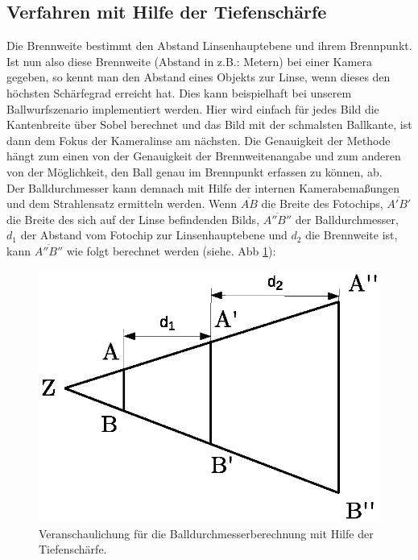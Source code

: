 \documentclass{ezb}
\begin{document}
\subsection{Verfahren mit Hilfe der Tiefenschärfe}
Die Brennweite bestimmt den Abstand Linsenhauptebene und ihrem Brennpunkt. Ist nun also diese Brennweite (Abstand in z.B.: Metern) bei einer Kamera gegeben, so kennt man den Abstand eines Objekts zur Linse, wenn dieses den höchsten Schärfegrad erreicht hat. Dies kann beispielhaft bei unserem Ballwurfszenario implementiert werden. Hier wird einfach für jedes Bild die Kantenbreite über Sobel berechnet und das Bild mit der schmalsten Ballkante, ist dann dem Fokus der Kameralinse am nächsten. Die Genauigkeit der Methode hängt zum einen von der Genauigkeit der Brennweitenangabe und zum anderen von der Möglichkeit, den Ball genau im Brennpunkt erfassen zu können, ab.\\
\linebreak
Der Balldurchmesser kann demnach mit Hilfe der internen Kamerabemaßungen und dem Strahlensatz ermitteln werden. Wenn $\overline{AB}$ die Breite des Fotochips, $\overline{A'B'}$ die Breite des sich auf der Linse befindenden Bilds, $\overline{A''B''}$ der Balldurchmesser, $d_{1}$ der Abstand vom Fotochip zur Linsenhauptebene und $d_{2}$ die Brennweite ist, kann $\overline{A''B''}$  wie folgt berechnet werden (siehe. Abb \ref{abb:Strahlensatz}):\\
\linebreak
\begin{figure}[!h]
\centering
\includegraphics[scale=0.6]{./Strahlensatz.eps}
\caption{Veranschaulichung für die Balldurchmesserberechnung mit Hilfe der Tiefenschärfe.}
\label{abb:Strahlensatz}
\end{figure}
\end{document}
